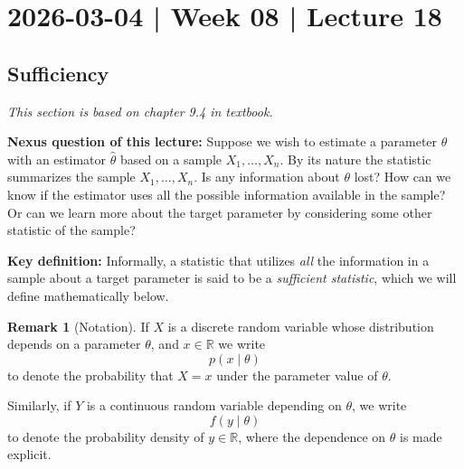 \documentclass[10pt]{article}
\theoremstyle{definition}
\newtheorem{remark}[theorem]{Remark}
\newcommand{\vt}{\vskip 5mm} %
\newcommand{\Fl}{\vt\noindent\textbf} %
\newcommand{\1}[1]{\textbf{1}_{\left[#1\right]}} %
\def\R{\mathbb{R}} %
\begin{document}
\newpage
\section{2026-03-04 | Week 08 | Lecture 18}

\subsection{Sufficiency}
\textit{This section is based on chapter 9.4 in textbook.}

\Fl{Nexus question of this lecture:} Suppose we wish to estimate a parameter
$\theta$ with an estimator $\widehat{\theta}$ based on a sample
$X_{1},\ldots,X_{n}$. By its nature the statistic summarizes the sample
$X_{1},\ldots,X_{n}$. Is any information about $\theta$ lost? How can we know
if the estimator uses all the possible information available in the sample? Or
can we learn more about the target parameter by considering some other
statistic of the sample?


\Fl{Key definition:} Informally, a statistic that utilizes \textit{all} the
information in a sample about a target parameter is said to be a
\textit{sufficient statistic}, which we will define mathematically below.

\begin{remark}[Notation]
  If $X$ is a discrete random variable whose distribution depends on a
  parameter $\theta$, and $x\in \R$ we write
  \begin{equation*}
    p(x\mid \theta)
  \end{equation*}
  to denote the probability that $X=x$ under the parameter value of $\theta$.

  Similarly, if $Y$ is a continuous random variable depending on $\theta$,  we write
  \begin{equation*}
    f(y\mid \theta)
  \end{equation*}
  to denote the probability density of $y\in \R$, where the dependence on
  $\theta$ is made explicit.
\end{remark}
\end{document}
